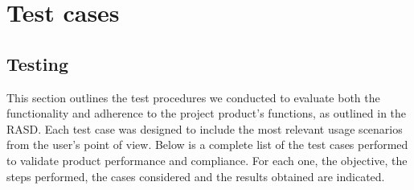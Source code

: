 \chapter{Test cases}

\section{Testing}
This section outlines the test procedures we conducted to evaluate both the functionality and adherence to the
project product's functions, as outlined in the RASD.
Each test case was designed to include the most relevant usage scenarios from the user's point of view.
Below is a complete list of the test cases performed to validate product performance and compliance.
For each one, the objective, the steps performed, the cases considered and the results obtained are indicated.

